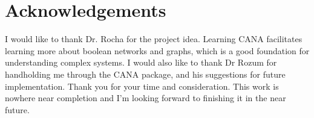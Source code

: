 \documentclass[letterpaper]{article}
\begin{document}
\section{Acknowledgements}
I would like to thank Dr. Rocha for the project idea. 
Learning CANA facilitates learning more about boolean networks and graphs, which is a good foundation for understanding complex systems.
I would also like to thank Dr Rozum for handholding me through the CANA package, and his suggestions for future implementation.
Thank you for your time and consideration. This work is nowhere near completion and I'm looking forward to finishing it in the near future. 

\footnotesize




\end{document}
